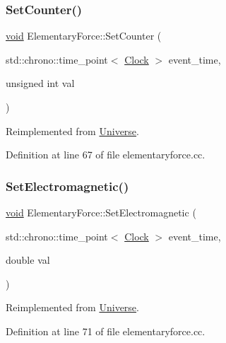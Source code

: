 \subsubsection{\texorpdfstring{Set\+Counter()}{SetCounter()}}
{\footnotesize\ttfamily \mbox{\hyperlink{glad_8h_a950fc91edb4504f62f1c577bf4727c29}{void}} Elementary\+Force\+::\+Set\+Counter (\begin{DoxyParamCaption}\item[{std\+::chrono\+::time\+\_\+point$<$ \mbox{\hyperlink{universe_8h_a0ef8d951d1ca5ab3cfaf7ab4c7a6fd80}{Clock}} $>$}]{event\+\_\+time,  }\item[{unsigned int}]{val }\end{DoxyParamCaption})\hspace{0.3cm}{\ttfamily [virtual]}}



Reimplemented from \mbox{\hyperlink{class_universe_aa22202ae740eb1355529afcb13285e91}{Universe}}.



Definition at line 67 of file elementaryforce.\+cc.

\mbox{\label{class_elementary_force_a67f6845bd715c29c17387d291b343a1b}} 
\subsubsection{\texorpdfstring{Set\+Electromagnetic()}{SetElectromagnetic()}}
{\footnotesize\ttfamily \mbox{\hyperlink{glad_8h_a950fc91edb4504f62f1c577bf4727c29}{void}} Elementary\+Force\+::\+Set\+Electromagnetic (\begin{DoxyParamCaption}\item[{std\+::chrono\+::time\+\_\+point$<$ \mbox{\hyperlink{universe_8h_a0ef8d951d1ca5ab3cfaf7ab4c7a6fd80}{Clock}} $>$}]{event\+\_\+time,  }\item[{double}]{val }\end{DoxyParamCaption})\hspace{0.3cm}{\ttfamily [virtual]}}



Reimplemented from \mbox{\hyperlink{class_universe_aa981fc7e252b1fbbb675f0371860954d}{Universe}}.



Definition at line 71 of file elementaryforce.\+cc.

